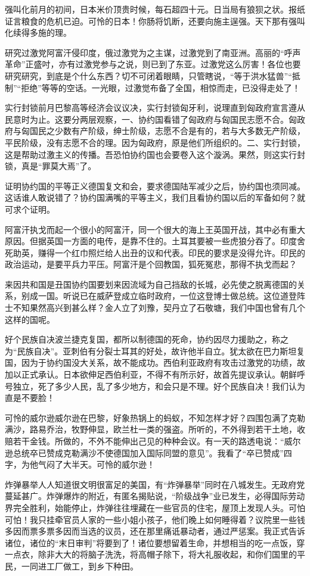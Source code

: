 强叫化前月的初间，日本米价顶贵时候，每石超四十元。日当局有狼狈之状。报纸证言粮食的危机已迫。可怜的日本！你肠将饥断，还要向施主逞强。天下那有强叫化续得多施的理。

研究过激党阿富汗侵印度，俄过激党为之主谋，过激党到了南亚洲。高丽的“呼声革命”正盛吋，亦有过激党参与之说，则已到了东亚。过激党这么厉害！各位也要研究研究，到底是个什么东西？切不可闭着眼睛，只管瞎说，“等于洪水猛兽”“抵制”“拒绝”等等的空话。一光眼，过激觉布备了全国，相惊而走，已没得走处了！

实行封锁前月巴黎高等经济会议议决，实行封锁匈牙利，说理直到匈政府宣言遵从民意时为止。这要分两层观察，一、协约国看错了匈政府与匈国民志愿不合。匈政府与匈国民之少数有产阶级，绅士阶级，志愿不合是有的，若与大多数无产阶级，平民阶级，没有志愿不合的理。因为匈政府，原是他们所组织的。二、实行封锁，这是帮助过激主义的传播。吾恐怕协约国也会要卷入这个漩涡。果然，则这实行封锁，真是“罪莫大焉”了。

证明协约国的平等正义德国复文和会，要求德国陆军减少之后，协约国也须同减。这话谁人敢说错了？协约国满嘴的平等主义，我们且看协约国以后的军备如何？就可求个证明。

阿富汗执戈而起一个很小的阿富汗，同一个很大的海上王英国开战，其中必有重大原因。但据英国一方面的电传，是靠不住的。土耳其要被一些虎狼分吞了。印度舍死助英，赚得一个红巾照烂给人出丑的议和代表。印民的要求是没得允许。印民的政治运动，是要平兵力平压。阿富汗是个回教国，狐死冤悲，那得不执戈而起？

来因共和国是丑国协约国要划来因流域为自己挡敌的长城，必先使之脱离德国的关系，别成一国。听说已在威萨登成立临时政府，一位这登博士做总统。这位道登阵士不知果然高兴到甚么样？金人立了刘豫，契丹立了石敬塘，我们中国也曾有几个这样的国呢。

好个民族自决波兰捷克复国，都所以制德国的死命，协约因尽力援助之，称之为“民族自决”。亚刺伯有分裂士耳其的好处，故许他半自立。犹太欲在巴力斯坦复国，因为于协约国没大关系，故不能成功。西伯利亚政府有攻击过激党的功绩，故加以正式承认。日本欲伸足西伯利亚，不得不有所示好，故首先提议承认。朝鲜呼号独立，死了多少人民，乱了多少地方，和会只是不理。好个民族自决！我们认为直是不要脸！

可怜的威尔逊威尔逊在巴黎，好象热锅上的蚂蚁，不知怎样才好？四围包满了克勒满沙，路易乔治，牧野伸显，欧兰杜一类的强盗。所听的，不外得到若干土地，收赔若干金钱。所做的，不外不能伸出己见的种种会议。有一天的路透电说：“威尔逊总统卒已赞成克勒满沙不使德国加入国际同盟的意见”。我看了“卒已赞成”四字，为他气闷了大半天。可怜的威尔逊！

炸弹暴举人人知道很文明很富足的美国，有“炸弹暴举”同时在八城发生。无政府党蔓延甚广。炸弹爆炸的附近，有匿名揭贴说，“阶级战争”业已发生，必得国际劳动界完全胜利，始能停止，炸弹往往埋藏在一些官员的住宅，屋顶上发现人头。可怕可怕！我只挂牵官员人家的一些小姐小孩子，他们晚上如何睡得着？议院里一些钱多因而票多票多因而当选的议员，还在那里痛诋暴动者，通过严惩案。我正式告诉诸位，诸位的“末日审判”将要到了！诸位要想留着生命，并想相当的吃一点饭，穿一点衣，除非大大的将脑子洗洗，将高帽子除下，将大礼服收起，和你们国里的平民，一同进工厂做工，到乡下种田。

